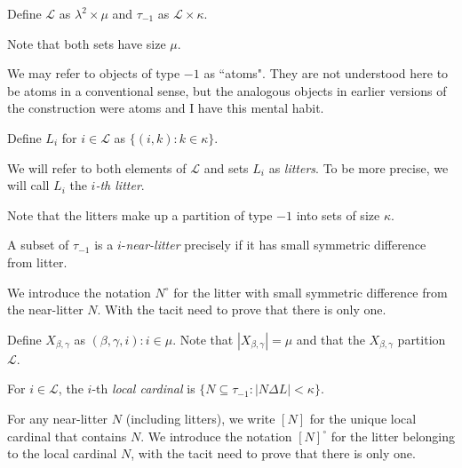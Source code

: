\begin{definition}
\label {def:atom}
\leanok
{}
Define $\mathcal L$ as $ \lambda ^ 2 \times \mu$ and $\tau_{-1}$ as $\mathcal L \times \kappa$.

Note that both sets have size $\mu$.
\end{definition}

We may refer to objects of type $-1$ as ``atoms".  They are not understood here to be atoms in a conventional sense, but the analogous objects in earlier versions of the construction were atoms and I have this mental habit.

\begin{definition}
\label {def:litter}
\leanok
{}
Define $L_i$ for $i \in \mathcal L$ as $\{(i, k) : k \in \kappa\}$.

We will refer to both elements of $\mathcal L$ and sets $L_i$ as {\em litters}. To be more precise,
we will call $L_i$ the {\em $i$-th litter}.

Note that the litters make up a partition of type $-1$ into sets of size $\kappa$.
\end{definition}

\begin{definition}
\label {def:near-litter}
\leanok
{}
A subset of $\tau_{-1}$ is a $i$-{\em near-litter} precisely if it has small symmetric difference from  litter.

We introduce the notation $N^\circ$ for the litter with small symmetric difference from the near-litter $N$.
With the tacit need to prove that there is only one.
\end{definition}

\begin{definition}
\label {def:ftargets}
\leanok
{}
Define $X_{\beta,\gamma}$ as ${(\beta, \gamma, i) : i \in \mu}$. Note that $|X_{\beta,\gamma}| = \mu$ and that the $X_{\beta,\gamma}$ partition $\mathcal L$.
\end{definition}

\begin{definition}
\label {def:local-cardinal}
For $i \in \mathcal L$, the $i$-th {\em local cardinal} is $\{N \subseteq \tau_{-1}:|N \Delta L|<\kappa\}$.

For any near-litter $N$ (including litters), we write $[N]$ for the unique local cardinal that contains $N$. We introduce the notation $[N]^\circ$ for the litter belonging to the local cardinal $N$, with the tacit need to prove that there is only one.
\end{definition}

